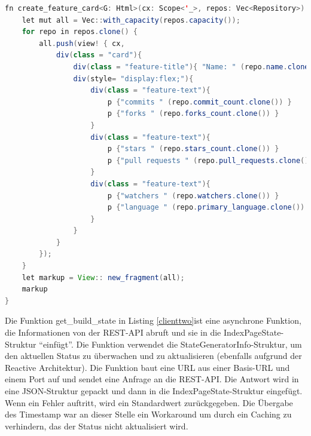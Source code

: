 \documentclass[notitlepage, hidelinks]{article}
\begin{document}
\begin{lstlisting}[language=Java,frame=single,caption=Markup im Framework Perseus/Sycamore in Rust,label=clientone]
fn create_feature_card<G: Html>(cx: Scope<'_>, repos: Vec<Repository>) -> View<G> {
    let mut all = Vec::with_capacity(repos.capacity());
    for repo in repos.clone() {
        all.push(view! { cx,
            div(class = "card"){
                div(class = "feature-title"){ "Name: " (repo.name.clone()) ", erstellt am " (repo.created_at.clone()) }
                div(style= "display:flex;"){
                    div(class = "feature-text"){
                        p {"commits " (repo.commit_count.clone()) }
                        p {"forks " (repo.forks_count.clone()) }
                    }
                    div(class = "feature-text"){
                        p {"stars " (repo.stars_count.clone()) }
                        p {"pull requests " (repo.pull_requests.clone()) }
                    }
                    div(class = "feature-text"){
                        p {"watchers " (repo.watchers.clone()) }
                        p {"language " (repo.primary_language.clone()) }
                    }
                }
            }
        });
    }
    let markup = View:: new_fragment(all);
    markup
}
\end{lstlisting}

Die Funktion get\_build\_state in Listing \ref{clienttwo}ist eine asynchrone Funktion, die Informationen von der REST-API abruft und sie in die IndexPageState-Struktur ``einfügt''. Die Funktion verwendet die StateGeneratorInfo-Struktur, um den aktuellen Status zu überwachen und zu aktualisieren (ebenfalls aufgrund der Reactive Architektur). Die Funktion baut eine URL aus einer Basis-URL und einem Port auf und sendet eine Anfrage an die REST-API. Die Antwort wird in eine JSON-Struktur gepackt und dann in die IndexPageState-Struktur eingefügt. Wenn ein Fehler auftritt, wird ein Standardwert zurückgegeben. Die Übergabe des Timestamp war an dieser Stelle ein Workaround um durch ein Caching zu verhindern, das der Status nicht aktualisiert wird. 
\end{document}
